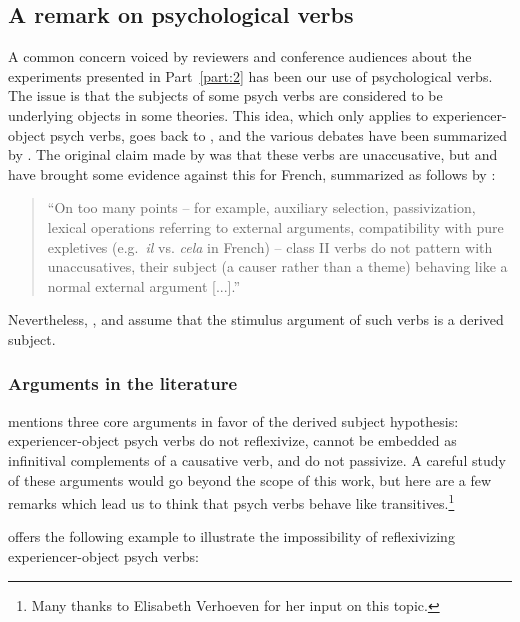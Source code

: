 \subsection{A remark on psychological verbs}
\label{ch:psych-verbs-internal-arguments}

A common concern voiced by reviewers and conference audiences about the experiments presented in Part~\ref{part:2} has been our use of psychological verbs. The issue is that the subjects of some psych verbs are considered to be underlying objects in some theories. This idea, which only applies to experiencer-object psych verbs, goes back to \citet{Belletti.1988}, and the various debates have been summarized by \citet{Landau.2010}. The original claim made by \citet{Belletti.1988} was that these verbs are unaccusative, but \citet{Legendre.1989} and \citet{Herschensohn.1992} have brought some evidence against this for French, summarized as follows by \citeauthor{Landau.2010}: 

\begin{quote}
    ``On too many points -- for example, auxiliary selection, passivization, lexical operations referring to external arguments, compatibility with pure expletives (e.g.\ \emph{il} vs. \emph{cela} in French) -- class II verbs do not pattern with unaccusatives, their subject (a causer rather than a theme) behaving like a normal external argument [...].'' \citep[38--39]{Landau.2010}
\end{quote}

Nevertheless, \citet{Legendre.1989}, \citet{Herschensohn.1992} and \citet{Landau.2010} assume that the stimulus argument of such verbs is a derived subject.

\subsubsection{Arguments in the literature}

 \citet{Landau.2010} mentions three core arguments in favor of the derived subject hypothesis: experiencer-object psych verbs do not reflexivize, cannot be embedded as infinitival complements of a causative verb, and do not passivize. A careful study of these arguments would go beyond the scope of this work, but here are a few remarks which lead us to think that psych verbs behave like transitives.\footnote{Many thanks to Elisabeth Verhoeven for her input on this topic.}

\citet{Herschensohn.1992} offers the following example to illustrate the impossibility of reflexivizing experiencer-object psych verbs:

